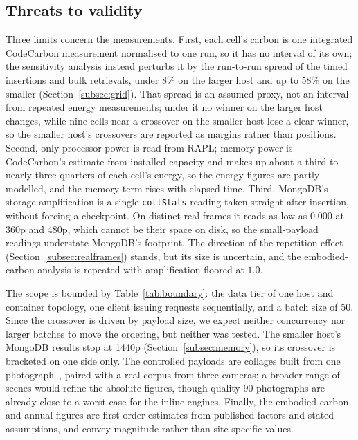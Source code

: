 \documentclass[pdflatex,sn-basic]{sn-jnl}%
\begin{document}
\subsection{Threats to validity}\label{subsec:threats}
Three limits concern the measurements. First, each cell's carbon is one integrated CodeCarbon measurement normalised to one run, so it has no interval of its own; the sensitivity analysis instead perturbs it by the run-to-run spread of the timed insertions and bulk retrievals, under $8\%$ on the larger host and up to $58\%$ on the smaller (Section~\ref{subsec:grid}). That spread is an assumed proxy, not an interval from repeated energy measurements; under it no winner on the larger host changes, while nine cells near a crossover on the smaller host lose a clear winner, so the smaller host's crossovers are reported as margins rather than positions. Second, only processor power is read from RAPL; memory power is CodeCarbon's estimate from installed capacity and makes up about a third to nearly three quarters of each cell's energy, so the energy figures are partly modelled, and the memory term rises with elapsed time. Third, MongoDB's storage amplification is a single \texttt{collStats} reading taken straight after insertion, without forcing a checkpoint. On distinct real frames it reads as low as $0.000$ at 360p and 480p, which cannot be their space on disk, so the small-payload readings understate MongoDB's footprint. The direction of the repetition effect (Section~\ref{subsec:realframes}) stands, but its size is uncertain, and the embodied-carbon analysis is repeated with amplification floored at $1.0$.

The scope is bounded by Table~\ref{tab:boundary}: the data tier of one host and container topology, one client issuing requests sequentially, and a batch size of 50. Since the crossover is driven by payload size, we expect neither concurrency nor larger batches to move the ordering, but neither was tested. The smaller host's MongoDB results stop at 1440p (Section~\ref{subsec:memory}), so its crossover is bracketed on one side only. The controlled payloads are collages built from one photograph~\citep{pexels_durdle_door}, paired with a real corpus from three cameras; a broader range of scenes would refine the absolute figures, though quality-90 photographs are already close to a worst case for the inline engines. Finally, the embodied-carbon and annual figures are first-order estimates from published factors and stated assumptions, and convey magnitude rather than site-specific values.
\end{document}
